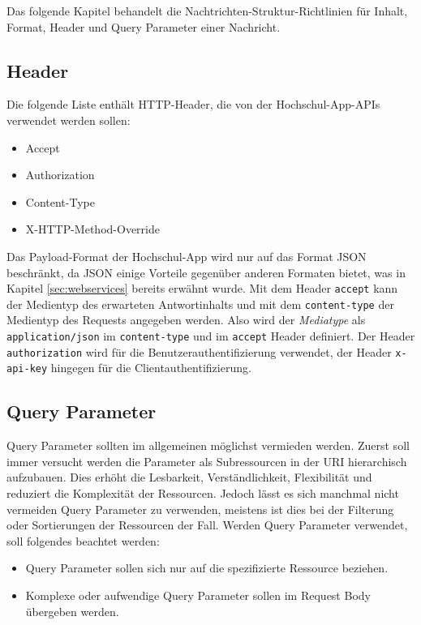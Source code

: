 Das folgende Kapitel behandelt die Nachtrichten-Struktur-Richtlinien für Inhalt, Format, Header und Query Parameter einer Nachricht.

\subsection{Header}

Die folgende Liste enthält HTTP-Header, die von der Hochschul-\ac{App}-\acp{API} verwendet werden sollen:

\begin{itemize}
\item Accept
\item Authorization
\item Content-Type
\item X-HTTP-Method-Override
\end{itemize}

Das Payload-Format der Hochschul-\ac{App} wird nur auf das Format \ac{JSON} beschränkt, da \ac{JSON} einige Vorteile gegenüber anderen Formaten bietet, was in Kapitel \ref{sec:webservices} bereits erwähnt wurde. Mit dem Header \lstinline[columns=fixed]{accept} %
kann der Medientyp des erwarteten Antwortinhalts und mit dem \lstinline[columns=fixed]{content-type} %
der Medientyp des Requests angegeben werden. Also wird der \textit{Mediatype} als \lstinline[columns=fixed]{application/json} im \lstinline[columns=fixed]{content-type} und im \lstinline[columns=fixed]{accept} Header definiert. Der Header \lstinline[columns=fixed]{authorization} wird für die Benutzerauthentifizierung verwendet, der Header \lstinline[columns=fixed]{x-api-key} hingegen für die Clientauthentifizierung.%

\subsection{Query Parameter}

Query Parameter sollten im allgemeinen möglichst vermieden werden. Zuerst soll immer versucht werden die Parameter als Subressourcen in der \ac{URI} hierarchisch aufzubauen. Dies erhöht die Lesbarkeit, Verständlichkeit, Flexibilität und reduziert die Komplexität der Ressourcen. Jedoch lässt es sich manchmal nicht vermeiden Query Parameter zu verwenden, meistens ist dies bei der Filterung oder Sortierungen der Ressourcen der Fall. Werden Query Parameter verwendet, soll folgendes beachtet werden:

\begin{itemize}
\item Query Parameter sollen sich nur auf die spezifizierte Ressource beziehen.
\item Komplexe oder aufwendige Query Parameter sollen im Request Body übergeben werden.
\end{itemize}


